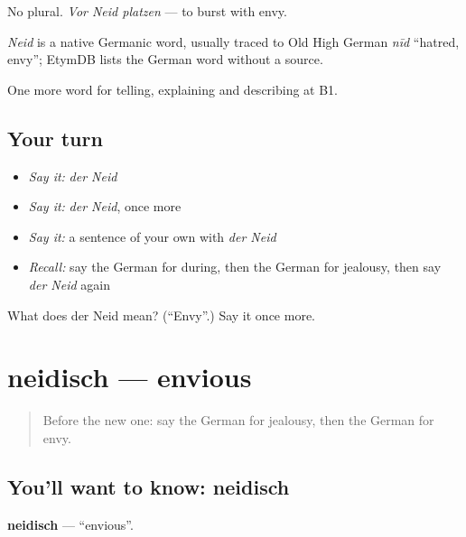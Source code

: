 No plural. \emph{Vor Neid platzen} — to burst with envy.

\begin{cousinweb}
\emph{Neid} is a native Germanic word, usually traced to Old High German \emph{nīd} \textquotedblleft{}hatred, envy\textquotedblright{}; EtymDB lists the German word without a source.
\end{cousinweb}

\begin{grammarlens}[title={What you've built}]
One more word for telling, explaining and describing at B1.
\end{grammarlens}

\subsection*{Your turn}
\begin{itemize}
\raggedright
  \item \emph{Say it:} \emph{der Neid}
  \item \emph{Say it:} \emph{der Neid}, once more
  \item \emph{Say it:} a sentence of your own with \emph{der Neid}
  \item \emph{Recall:} say the German for during, then the German for jealousy, then say \emph{der Neid} again
\end{itemize}

\begin{tcolorbox}[breakable,colback=teal!4,colframe=teal!35!black,title={Before you move on}]
What does der Neid mean? (\textquotedblleft{}Envy\textquotedblright{}.) Say it once more.
\end{tcolorbox}
\section[neidisch]{neidisch — envious}

\label{lesson:GE-C466-neidisch}



\begin{quote}
Before the new one: say the German for jealousy, then the German for envy.
\end{quote}

\subsection*{You'll want to know: neidisch}
\textbf{neidisch} — \textquotedblleft{}envious\textquotedblright{}.

